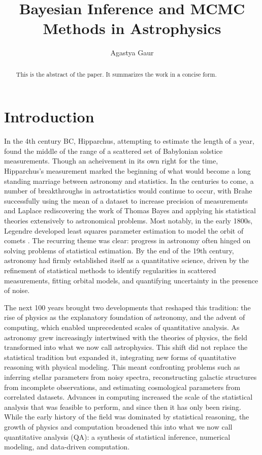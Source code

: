 \documentclass[twocolumn,linenumbers]{aastex631}
\begin{document}
\label{placeholder} %

\title{Bayesian Inference and MCMC Methods in Astrophysics}
\author{Agastya Gaur}

\begin{abstract}
  This is the abstract of the paper. It summarizes the work in a concise form.
\end{abstract}

\tableofcontents

\section{Introduction}
\label{sec:Introduction}
In the 4th century BC, Hipparchus, attempting to estimate the length of a year, found the middle of the range of a scattered set of Babylonian solstice measurements. Though an acheivement in its own right for the time, Hipparchus's measurement marked the beginning of what would become a long standing marriage between astronomy and statistics. In the centuries to come, a number of breakthroughs in astrostatistics would continue to occur, with Brahe successfully using the mean of a dataset to increase precision of measurements and Laplace rediscovering the work of Thomas Bayes and applying his statistical theories extensively to astronomical problems. Most notably, in the early 1800s, Legendre developed least squares parameter estimation to model the orbit of comets \citep{feigelsonStatisticalChallengesModern2004}. The recurring theme was clear: progress in astronomy often hinged on solving problems of statistical estimation. By the end of the 19th century, astronomy had firmly established itself as a quantitative science, driven by the refinement of statistical methods to identify regularities in scattered measurements, fitting orbital models, and quantifying uncertainty in the presence of noise.

The next 100 years brought two developments that reshaped this tradition: the rise of physics as the explanatory foundation of astronomy, and the advent of computing, which enabled unprecedented scales of quantitative analysis. As astronomy grew increasingly intertwined with the theories of physics, the field transformed into what we now call astrophysics. This shift did not replace the statistical tradition but expanded it, integrating new forms of quantitative reasoning with physical modeling. This meant confronting problems such as inferring stellar parameters from noisy spectra, reconstructing galactic structures from incomplete observations, and estimating cosmological parameters from correlated datasets. Advances in computing increased the scale of the statistical analysis that was feasible to perform, and since then it has only been rising. While the early history of the field was dominated by statistical reasoning, the growth of physics and computation broadened this into what we now call quantitative analysis (QA): a synthesis of statistical inference, numerical modeling, and data-driven computation.
\end{document}
